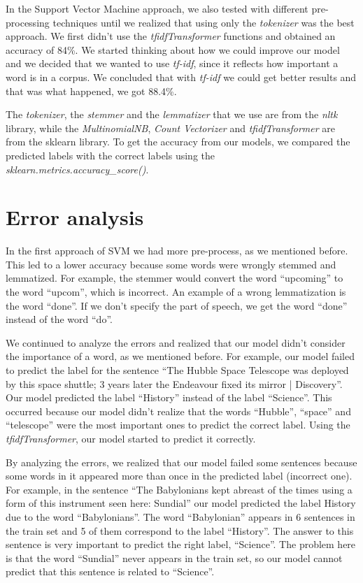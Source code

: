 \documentclass[11pt]{article}
\begin{document}
\begin{multicols}{2}
In the Support Vector Machine approach, we also tested with different pre-processing techniques until we realized that using only the \emph{tokenizer} was the best approach. We first didn’t use the \emph{tfidfTransformer} functions and obtained an accuracy of 84\%. We started thinking about how we could improve our model and we decided that we wanted to use \emph{tf-idf}, since it reflects how important a word is in a corpus. We concluded that with \emph{tf-idf} we could get better results and that was what happened, we got 88.4\%.

The \emph{tokenizer}, the \emph{stemmer} and the \emph{lemmatizer} that we use are from the \emph{nltk} library, while the \emph{MultinomialNB}, \emph{Count Vectorizer} and \emph{tfidfTransformer} are from the sklearn library. To get the accuracy from our models, we compared the predicted labels with the correct labels using the \emph{sklearn.metrics.accuracy\_score()}.

\section{Error analysis}

In the first approach of SVM we had more pre-process, as we mentioned before. This led to a lower accuracy because some words were wrongly stemmed and lemmatized. For example, the stemmer would convert the word “upcoming” to the word “upcom”, which is incorrect. An example of a wrong lemmatization is the word “done”. If we don’t specify the part of speech, we get the word “done” instead of the word “do”.

We continued to analyze the errors and realized that our model didn’t consider the importance of a word, as we mentioned before. For example, our model failed to predict the label for the sentence “The Hubble Space Telescope was deployed by this space shuttle; 3 years later the Endeavour fixed its mirror | Discovery”. Our model predicted the label “History” instead of the label “Science”. This occurred because our model didn’t realize that the words “Hubble”, “space” and “telescope” were the most important ones to predict the correct label. Using the \emph{tfidfTransformer}, our model started to predict it correctly.

By analyzing the errors, we realized that our model failed some sentences because some words in it appeared more than once in the predicted label (incorrect one). For example, in the sentence “The Babylonians kept abreast of the times using a form of this instrument seen here: Sundial” our model predicted the label History due to the word “Babylonians”. The word “Babylonian” appears in 6 sentences in the train set and 5 of them correspond to the label “History”. The answer to this sentence is very important to predict the right label, “Science”. The problem here is that the word “Sundial” never appears in the train set, so our model cannot predict that this sentence is related to “Science”.


\end{multicols}
\end{document}
